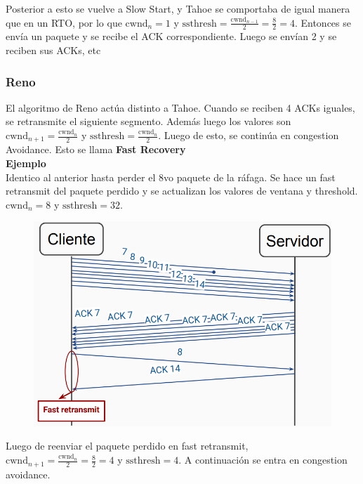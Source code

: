 \documentclass[titlepage,a4paper]{article}
\begin{document}
Posterior a esto se vuelve a Slow Start, y Tahoe se comportaba de igual manera que en un RTO, por lo que $\mathrm{cwnd}_n = 1$ y $\mathrm{ssthresh} = \frac{\mathrm{cwnd}_{n-1}}{2} = \frac{8}{2} = 4 $. Entonces se envía un paquete y se recibe el ACK correspondiente. Luego se envían 2 y se reciben sus ACKs, etc


\subsubsection{Reno}

El algoritmo de Reno actúa distinto a Tahoe. Cuando se reciben 4 ACKs iguales, se retransmite el siguiente segmento. Además luego los valores son $ \mathrm{cwnd}_{n+1} = \frac{\mathrm{cwnd}_{n}}{2} $ y $ \mathrm{ssthresh} = \frac{\mathrm{cwnd}_{n}}{2} $. Luego de esto, se continúa en congestion Avoidance. Esto se llama \textbf{Fast Recovery} \\

\textbf{Ejemplo} \\

Identico al anterior hasta perder el 8vo paquete de la ráfaga. Se hace un fast retransmit del paquete perdido y se actualizan los valores de ventana y threshold. $\mathrm{cwnd}_n = 8 $ y $\mathrm{ssthresh} = 32$.

\begin{figure}[H]
\centering
\includegraphics[width=\textwidth]{imagenes/fastRetransmit.png}
\end{figure}

Luego de reenviar el paquete perdido en fast retransmit,  $\mathrm{cwnd}_{n+1} = \frac{\mathrm{cwnd}_{n}}{2} = \frac{8}{2} = 4 $ y $\mathrm{ssthresh} = 4 $. A continuación se entra en congestion avoidance.
\end{document}
